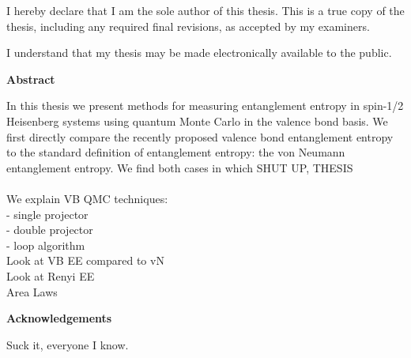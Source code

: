 \cleardoublepage %
 


  \noindent
I hereby declare that I am the sole author of this thesis. This is a true copy of the thesis, including any required final revisions, as accepted by my examiners.

  \bigskip
  
  \noindent
I understand that my thesis may be made electronically available to the public.

\cleardoublepage


\begin{center}\textbf{Abstract}\end{center}

In this thesis we present methods for measuring entanglement entropy in spin-1/2 Heisenberg systems using quantum Monte Carlo 
in the valence bond basis.  We first directly compare the recently proposed valence bond entanglement entropy to the standard definition
of entanglement entropy: the von Neumann entanglement entropy.  We find both cases in which SHUT UP, THESIS
\\\\
We explain VB QMC techniques:\\
 - single projector\\
 - double projector\\
 - loop algorithm\\
Look at VB EE compared to vN\\
Look at Renyi EE\\
Area Laws\\

\cleardoublepage


\begin{center}\textbf{Acknowledgements}\end{center}

Suck it, everyone I know.  
\cleardoublepage

